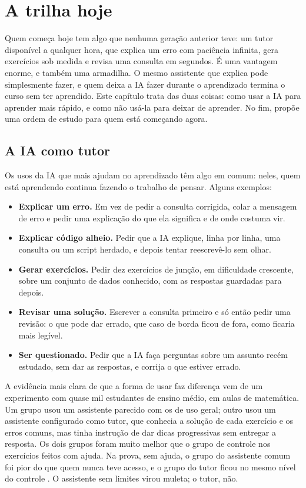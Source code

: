 \chapter{A trilha hoje}
\label{cap:trilha-hoje}

Quem começa hoje tem algo que nenhuma geração anterior teve: um tutor disponível a
qualquer hora, que explica um erro com paciência infinita, gera exercícios sob medida e
revisa uma consulta em segundos. É uma vantagem enorme, e também uma armadilha. O mesmo
assistente que explica pode simplesmente fazer, e quem deixa a IA fazer durante o
aprendizado termina o curso sem ter aprendido. Este capítulo trata das duas coisas: como
usar a IA para aprender mais rápido, e como não usá-la para deixar de aprender. No fim,
propõe uma ordem de estudo para quem está começando agora.

\section{A IA como tutor}
\label{sec:ia-tutor}

Os usos da IA que mais ajudam no aprendizado têm algo em comum: neles, quem está
aprendendo continua fazendo o trabalho de pensar. Alguns exemplos:

\begin{itemize}
  \item \textbf{Explicar um erro.} Em vez de pedir a consulta corrigida, colar a mensagem
    de erro e pedir uma explicação do que ela significa e de onde costuma vir.
  \item \textbf{Explicar código alheio.} Pedir que a IA explique, linha por linha, uma
    consulta ou um script herdado, e depois tentar reescrevê-lo sem olhar.
  \item \textbf{Gerar exercícios.} Pedir dez exercícios de junção, em dificuldade
    crescente, sobre um conjunto de dados conhecido, com as respostas guardadas para
    depois.
  \item \textbf{Revisar uma solução.} Escrever a consulta primeiro e só então pedir uma
    revisão: o que pode dar errado, que caso de borda ficou de fora, como ficaria mais
    legível.
  \item \textbf{Ser questionado.} Pedir que a IA faça perguntas sobre um assunto recém
    estudado, sem dar as respostas, e corrija o que estiver errado.
\end{itemize}

A evidência mais clara de que a forma de usar faz diferença vem de um experimento com
quase mil estudantes de ensino médio, em aulas de matemática. Um grupo usou um assistente
parecido com os de uso geral; outro usou um assistente configurado como tutor, que conhecia
a solução de cada exercício e os erros comuns, mas tinha instrução de dar dicas
progressivas sem entregar a resposta. Os dois grupos foram muito melhor que o grupo de
controle nos exercícios feitos com ajuda. Na prova, sem ajuda, o grupo do assistente comum
foi pior do que quem nunca teve acesso, e o grupo do tutor ficou no mesmo nível do controle
\parencite{bastani2025}. O assistente sem limites virou muleta; o tutor, não.


